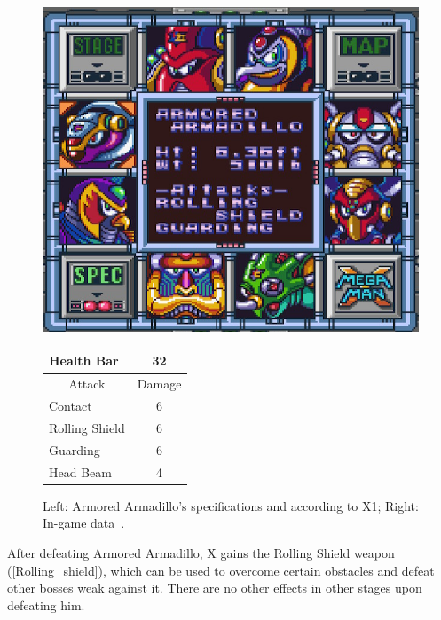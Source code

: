 \begin{figure}[htp]
	\begin{minipage}[c]{0.45\linewidth}
		\vspace{0pt}
		\centering
		\includegraphics[width=\linewidth]{figures/X1/Armored_armadillo/Armored_armadillo_specs.png}
	\end{minipage}
	\begin{minipage}[c]{0.45\linewidth}
		\centering
		\vspace{0pt}
		\begin{tabular}[h]{l c}
			\toprule
			Health Bar & 32\\
			\midrule
			\multicolumn{1}{c}{Attack} & \multicolumn{1}{c}{Damage}\\
			Contact & 6\\
			Rolling Shield& 6\\
			Guarding & 6\\
			Head Beam & 4\\
			\bottomrule
		\end{tabular}
	\end{minipage}
	\caption{Left: Armored Armadillo's specifications and according to X1; Right: In-game data~\cite{wiki:Armored_Armadillo}. }
	\label{Armadillo_specs}
\end{figure}
After defeating Armored Armadillo, X gains the Rolling Shield weapon (\ref{Rolling_shield}), which can be used to overcome certain obstacles and defeat other bosses weak against it. There are no other effects in other stages upon defeating him.

